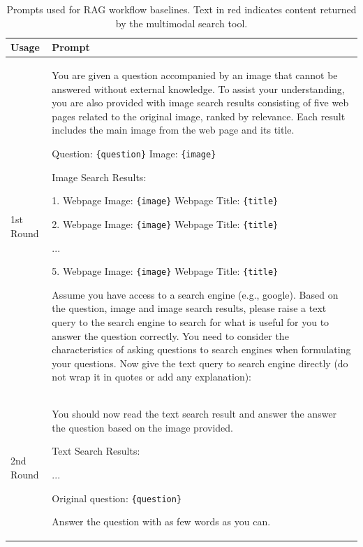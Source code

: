 \documentclass{article}
\newcommand{\search}[1]{\textcolor{search}{#1}}
\begin{document}
\begin{table}[t]
\centering
\caption{Prompts used for RAG workflow baselines. Text in \search{red} indicates content returned by the multimodal search tool.}
\label{tab:rag-prompt}
\begin{tabular}{p{1cm}|p{12cm}}
\toprule
\textbf{Usage} & \textbf{Prompt} \\ \midrule
1st Round & You are given a question accompanied by an image that cannot be answered without external knowledge. To assist your understanding, you are also provided with image search results consisting of five web pages related to the original image, ranked by relevance. Each result includes the main image from the web page and its title.

Question: \texttt{\{question\}} Image: \texttt{\{image\}}

\search{Image Search Results: }

\search{1. Webpage Image: \texttt{\{image\}} Webpage Title: \texttt{\{title\}}}

\search{2. Webpage Image: \texttt{\{image\}} Webpage Title: \texttt{\{title\}}}

\search{...}

\search{5. Webpage Image: \texttt{\{image\}} Webpage Title: \texttt{\{title\}}}

Assume you have access to a search engine (e.g., google). Based on the question, image and image search results, please raise a text query to the search engine to search for what is useful for you to answer the question correctly. You need to consider the characteristics of asking questions to search engines when formulating your questions. Now give the text query to search engine directly (do not wrap it in quotes or add any explanation): \\ \midrule
2nd Round & You should now read the text search result and answer the answer the question based on the image provided. 

\search{Text Search Results:}

\search{...}

Original question: \texttt{\{question\}}

Answer the question with as few words as you can.
\\ \bottomrule
\end{tabular}
\end{table}
\end{document}
